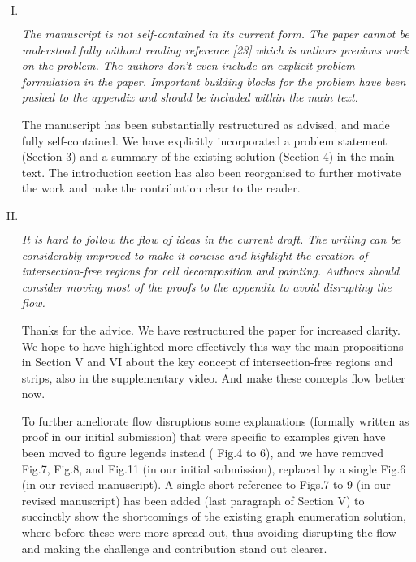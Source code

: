 \documentclass[11pt]{article}
\newenvironment{reviewer}
{\begin{mdframed}[roundcorner = 10pt,fontcolor=blue!70!black]\itshape}
{\end{mdframed}}
\begin{document}
\begin{enumerate}[I.]
 \item $ $
  \begin{reviewer}
    The manuscript is not self-contained in its current form. The paper cannot be understood fully without reading reference [23] which is authors previous work on the problem. 
The authors don't even include an explicit problem formulation in the paper. 
Important building blocks for the problem have been pushed to the appendix and should be included within the main text. 
    \end{reviewer}

\noindent
The manuscript has been substantially restructured as advised, and made fully self-contained. 
We have explicitly incorporated a problem statement (Section 3) and a summary of the existing solution (Section 4) in the main text. 
The introduction section has also been reorganised to further motivate the work and make the contribution clear to the reader.
  
  \item $ $
  \begin{reviewer}
It is hard to follow the flow of ideas in the current draft. 
The writing can be considerably improved to make it concise and highlight the creation of intersection-free regions for cell decomposition and painting. 
Authors should consider moving most of the proofs to the appendix to avoid disrupting the flow. 
   \end{reviewer}
  
\noindent
Thanks for the advice.
We have restructured the paper for increased clarity. We hope to have highlighted more effectively this way the main propositions in Section V and VI about the key concept of intersection-free regions and strips, also in the supplementary video. And make these concepts flow better now. 

To further ameliorate flow disruptions some explanations (formally written as proof in our initial submission) that were specific to examples given have been moved to figure legends instead ( Fig.4 to 6), and we have removed Fig.7, Fig.8, and Fig.11 (in our initial submission), replaced by a single Fig.6 (in our revised manuscript). 
A single short reference to Figs.7 to 9 (in our revised manuscript) has been added (last paragraph of Section V) to succinctly show the shortcomings of the existing graph enumeration solution, where before these were more spread out, thus avoiding disrupting the flow and making the challenge and contribution stand out clearer. 


\end{enumerate}
\end{document}
